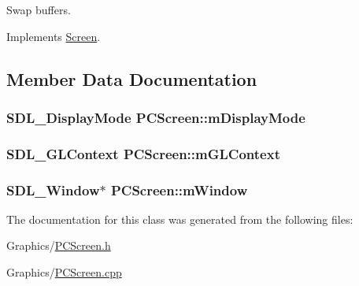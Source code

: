 Swap buffers. 



Implements \hyperlink{classScreen_ac4828d7dba6fd883d96175b00d2f856b}{Screen}.



\subsection{Member Data Documentation}
\subsubsection[{\texorpdfstring{m\+Display\+Mode}{mDisplayMode}}]{\setlength{\rightskip}{0pt plus 5cm}S\+D\+L\+\_\+\+Display\+Mode P\+C\+Screen\+::m\+Display\+Mode\hspace{0.3cm}{\ttfamily [private]}}\hypertarget{classPCScreen_a4d8588e01001588ba61b944677284b2e}{}\label{classPCScreen_a4d8588e01001588ba61b944677284b2e}
\subsubsection[{\texorpdfstring{m\+G\+L\+Context}{mGLContext}}]{\setlength{\rightskip}{0pt plus 5cm}S\+D\+L\+\_\+\+G\+L\+Context P\+C\+Screen\+::m\+G\+L\+Context\hspace{0.3cm}{\ttfamily [private]}}\hypertarget{classPCScreen_a0fc9525537126c2031556986b13df27b}{}\label{classPCScreen_a0fc9525537126c2031556986b13df27b}
\subsubsection[{\texorpdfstring{m\+Window}{mWindow}}]{\setlength{\rightskip}{0pt plus 5cm}S\+D\+L\+\_\+\+Window$\ast$ P\+C\+Screen\+::m\+Window\hspace{0.3cm}{\ttfamily [private]}}\hypertarget{classPCScreen_ac3e34ba132908e56f5c0390005975643}{}\label{classPCScreen_ac3e34ba132908e56f5c0390005975643}


The documentation for this class was generated from the following files\+:\begin{DoxyCompactItemize}
\item 
Graphics/\hyperlink{PCScreen_8h}{P\+C\+Screen.\+h}\item 
Graphics/\hyperlink{PCScreen_8cpp}{P\+C\+Screen.\+cpp}\end{DoxyCompactItemize}
